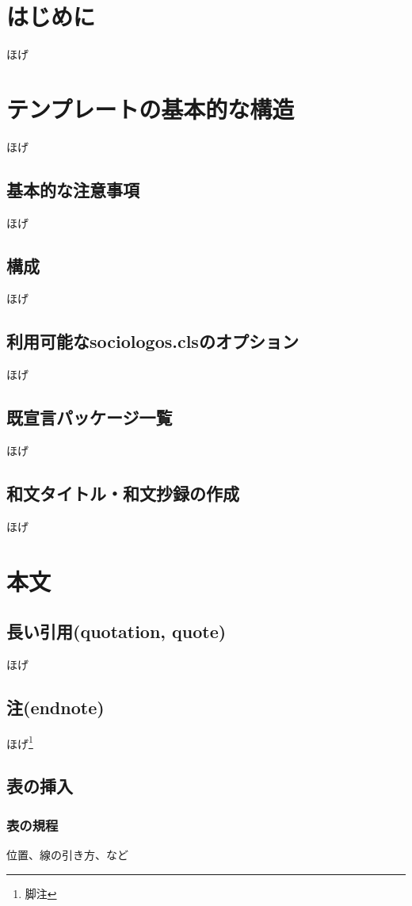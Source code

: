 \documentclass[]{sociologos}
\begin{document}
\section{はじめに}

ほげ

\section{テンプレートの基本的な構造}

ほげ

\subsection{基本的な注意事項}
ほげ

\subsection{構成}
ほげ
\subsection{利用可能なsociologos.clsのオプション}
ほげ
\subsection{既宣言パッケージ一覧}
ほげ
\subsection{和文タイトル・和文抄録の作成}
ほげ
\section{本文}
\subsection{長い引用(quotation, quote)}
ほげ
\subsection{注(endnote)}
ほげ\footnote{脚注}
\subsection{表の挿入}
\subsubsection{表の規程}

位置、線の引き方、など
\end{document}
